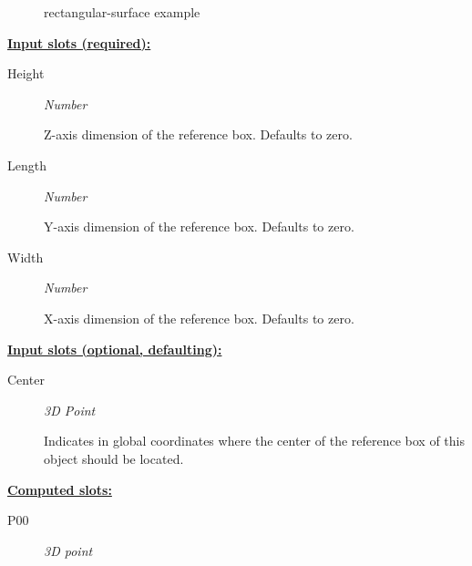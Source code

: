 \documentclass [11pt]{book}
\begin{document}
\begin{itemize}
\begin{figure}
\caption{rectangular-surface example}

\label{fig:rectangular-surface}

\end{figure}





\textbf{
\underline{Input slots (required):}}

\begin{description}

\item [Height]
\emph{Number}

 Z-axis dimension of the reference box. Defaults to zero.




\item [Length]
\emph{Number}

 Y-axis dimension of the reference box. Defaults to zero.




\item [Width]
\emph{Number}

 X-axis dimension of the reference box. Defaults to zero.




\end{description}






\textbf{
\underline{Input slots (optional, defaulting):}}

\begin{description}

\item [Center]
\emph{3D Point}

 Indicates in global coordinates where the center of the reference
box of this object should be located.




\end{description}






\textbf{
\underline{Computed slots:}}

\begin{description}

\item [P00]
\emph{3D point}


\end{description}
\end{itemize}
\end{document}
